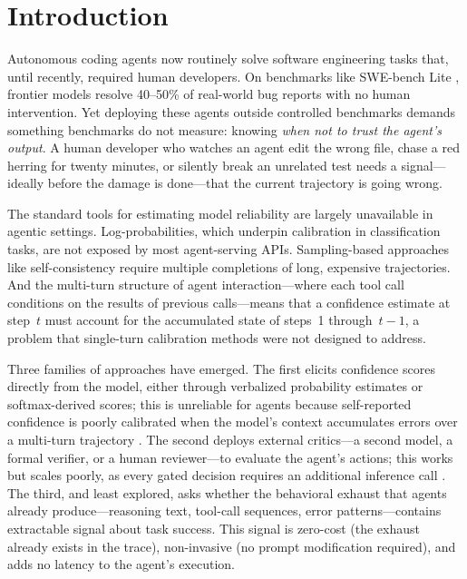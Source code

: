 \documentclass[11pt]{article}
\begin{document}
\section{Introduction}
\label{sec:intro}

Autonomous coding agents now routinely solve software engineering tasks that, until recently, required human developers.
On benchmarks like SWE-bench Lite \citep{jimenez2024swebench}, frontier models resolve 40--50\% of real-world bug reports with no human intervention.
Yet deploying these agents outside controlled benchmarks demands something benchmarks do not measure: knowing \emph{when not to trust the agent's output}.
A human developer who watches an agent edit the wrong file, chase a red herring for twenty minutes, or silently break an unrelated test needs a signal---ideally before the damage is done---that the current trajectory is going wrong.

The standard tools for estimating model reliability are largely unavailable in agentic settings.
Log-probabilities, which underpin calibration in classification tasks, are not exposed by most agent-serving APIs.
Sampling-based approaches like self-consistency require multiple completions of long, expensive trajectories.
And the multi-turn structure of agent interaction---where each tool call conditions on the results of previous calls---means that a confidence estimate at step~$t$ must account for the accumulated state of steps~1 through~$t{-}1$, a problem that single-turn calibration methods were not designed to address.

Three families of approaches have emerged.
The first elicits confidence scores directly from the model, either through verbalized probability estimates or softmax-derived scores; this is unreliable for agents because self-reported confidence is poorly calibrated when the model's context accumulates errors over a multi-turn trajectory \citep{kadavath2022language,xiong2024can,xuan2026confidence}.
The second deploys external critics---a second model, a formal verifier, or a human reviewer---to evaluate the agent's actions; this works but scales poorly, as every gated decision requires an additional inference call \citep{cuadron2025shepherd}.
The third, and least explored, asks whether the behavioral exhaust that agents already produce---reasoning text, tool-call sequences, error patterns---contains extractable signal about task success.
This signal is zero-cost (the exhaust already exists in the trace), non-invasive (no prompt modification required), and adds no latency to the agent's execution.
\end{document}

